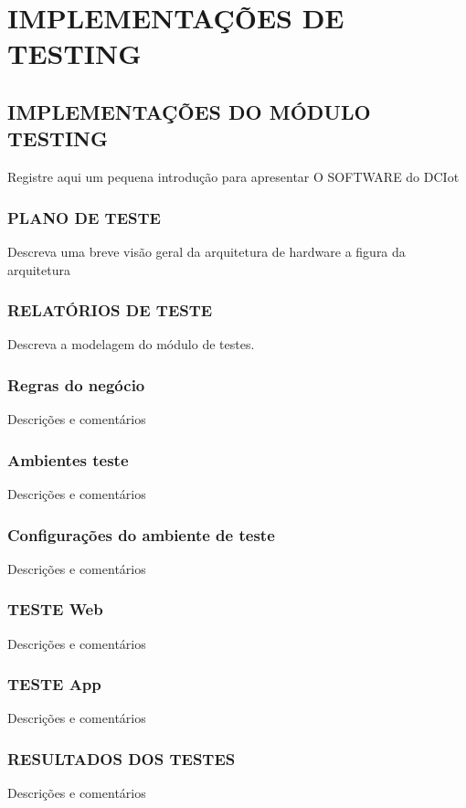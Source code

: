 \chapter{IMPLEMENTAÇÕES DE TESTING}


\section{IMPLEMENTAÇÕES DO MÓDULO TESTING}
Registre aqui um pequena introdução para apresentar O SOFTWARE do DCIot
\subsection{PLANO DE TESTE}
Descreva uma breve visão geral da arquitetura de hardware a figura da arquitetura
\subsection{RELATÓRIOS DE TESTE}
Descreva a modelagem do módulo de testes.

\subsection{Regras do negócio}

Descrições e comentários

\subsection{Ambientes teste}

Descrições e comentários

\subsection{Configurações do ambiente de teste}

Descrições e comentários

\subsection{TESTE Web}

Descrições e comentários

\subsection{TESTE App}

Descrições e comentários

\subsection{RESULTADOS DOS TESTES}


Descrições e comentários
